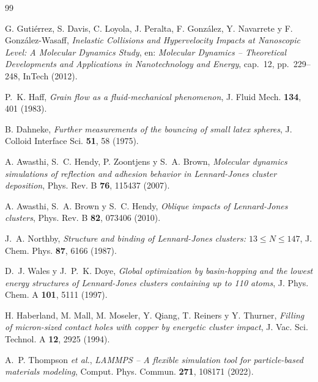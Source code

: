 \documentclass[aps,pre,twocolumn,reprint,superscriptaddress]{revtex4-2}
\begin{document}
\begin{thebibliography}{99}

G. Gutiérrez, S. Davis, C. Loyola, J. Peralta, F. González, Y. Navarrete
y F. González-Wasaff,
\textit{Inelastic Collisions and Hypervelocity Impacts at Nanoscopic Level:
A Molecular Dynamics Study},
en: \textit{Molecular Dynamics -- Theoretical Developments and Applications
in Nanotechnology and Energy}, cap.~12, pp.~229--248, InTech (2012).

P.~K. Haff,
\textit{Grain flow as a fluid-mechanical phenomenon},
J. Fluid Mech. \textbf{134}, 401 (1983).

B. Dahneke,
\textit{Further measurements of the bouncing of small latex spheres},
J. Colloid Interface Sci. \textbf{51}, 58 (1975).

A. Awasthi, S.~C. Hendy, P. Zoontjens y S.~A. Brown,
\textit{Molecular dynamics simulations of reflection and adhesion behavior in
Lennard-Jones cluster deposition},
Phys. Rev. B \textbf{76}, 115437 (2007).

A. Awasthi, S.~A. Brown y S.~C. Hendy,
\textit{Oblique impacts of Lennard-Jones clusters},
Phys. Rev. B \textbf{82}, 073406 (2010).

J.~A. Northby,
\textit{Structure and binding of Lennard-Jones clusters: $13 \le N \le 147$},
J. Chem. Phys. \textbf{87}, 6166 (1987).

D.~J. Wales y J.~P.~K. Doye,
\textit{Global optimization by basin-hopping and the lowest energy structures
of Lennard-Jones clusters containing up to 110 atoms},
J. Phys. Chem. A \textbf{101}, 5111 (1997).

H. Haberland, M. Mall, M. Moseler, Y. Qiang, T. Reiners y Y. Thurner,
\textit{Filling of micron-sized contact holes with copper by energetic cluster
impact},
J. Vac. Sci. Technol. A \textbf{12}, 2925 (1994).

A.~P. Thompson \textit{et al.},
\textit{LAMMPS -- A flexible simulation tool for particle-based materials
modeling},
Comput. Phys. Commun. \textbf{271}, 108171 (2022).

\end{thebibliography}
\end{document}
